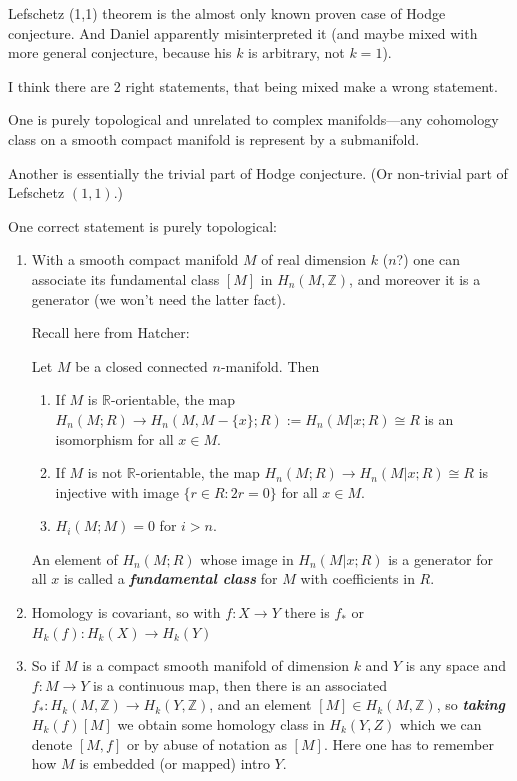 \begin{remark}\leavevmode
	{\color{lavendermagenta}
		Lefschetz (1,1) theorem is the almost only known proven case of Hodge conjecture. And Daniel apparently misinterpreted it (and maybe mixed with more general conjecture, because his $k$ is arbitrary, not $k=1$).

		I think there are 2 right statements, that being mixed make a wrong statement.
		
		One is purely topological and unrelated to complex manifolds---any cohomology class on a smooth compact manifold is represent by a submanifold.

		Another is essentially the trivial part of Hodge conjecture. (Or non-trivial part of Lefschetz $(1,1)$.)

		One correct statement is purely topological:
\begin{enumerate}
		\item With a smooth compact manifold $M$ of real dimension $k$ {\color{persimmon}($n$?)} one can associate its fundamental class $[M]$ in $H_n(M,\mathbb{Z})$, and moreover it is a generator (we won't need the latter fact).

		{\color{persimmon}Recall here from Hatcher:
		\begin{thm}[3.26]\leavevmode
			Let $M$ be a closed connected $n$-manifold. Then
			\begin{enumerate}
				\item If $M$ is $\mathbb{R}$-orientable, the map $H_{n}(M;R)\to H_{n}(M,M-\{x\};R):=H_{n}(M|x;R)\cong R$ is an isomorphism for all $x\in M$.
				\item If $M$ is not $\mathbb{R}$-orientable, the map $H_{n}(M;R)\to H_{n}(M|x;R)\cong R$ is injective with image $\{r\in R:2r=0\} $ for all $x\in M$.
				\item $H_{i}(M;M)=0$ for $i>n$.
			\end{enumerate}
		\end{thm}
	An element of $H_{n}(M;R)$ whose image in $H_{n}(M|x;R)$ is a generator for all $x$ is called a \textit{\textbf{fundamental class}} for $M$ with coefficients in $R$.}

	\item Homology is covariant, so with $f : X \to Y$ there is $f_*$ or $H_k(f) : H_k(X) \to  H_k(Y)$
	\item So if $M$ is a compact smooth manifold of dimension $k$ and $Y$ is any space and $f:M\to Y$ is a continuous map, then there is an associated $f_{*}:H_{k}(M,\mathbb{Z})\to H_{k}(Y,\mathbb{Z})$, and an element $[M]\in H_{k}(M,\mathbb{Z})$, so \textit{\textbf{taking}}  $H_{k}(f)[M]$ we obtain some homology class in $H_{k}(Y,Z)$ which we can denote $[M,f]$ or by abuse of notation as $[M]$. Here one has to remember how $M$ is embedded (or mapped) intro $Y$.


\end{enumerate}}
\end{remark}
